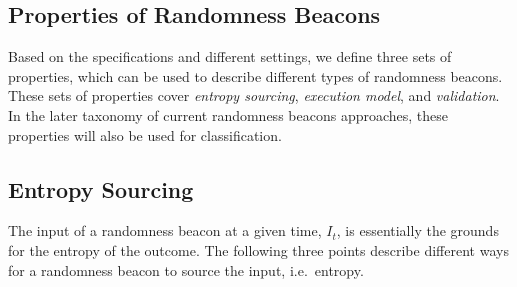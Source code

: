\subsection{Properties of Randomness Beacons}
Based on the specifications and different settings, we define three sets of properties, which can be used to describe different types of randomness beacons.
These sets of properties cover \emph{entropy sourcing}, \emph{execution model}, and \emph{validation}.
In the later taxonomy of current randomness beacons approaches, these properties will also be used for classification.

\subsection{Entropy Sourcing}
The input of a randomness beacon at a given time, $I_t$, is essentially the grounds for the entropy of the outcome.
The following three points describe different ways for a randomness beacon to source the input, i.e.\ entropy.
